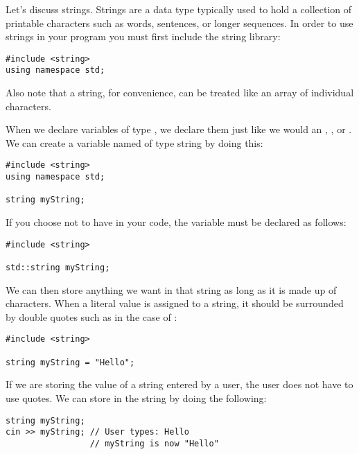 
Let's discuss strings.
Strings are a data type typically used to hold a collection of printable characters such as words, sentences, or longer sequences.
In order to use strings in your program you must first include the string library:
\begin{lstlisting}
#include <string>
using namespace std;
\end{lstlisting}

\noindent Also note that a string, for convenience, can be treated like an array of individual characters.

When we declare variables of type , we declare them just like we would an , , or .
We can create a variable named  of type string by doing this:

\begin{lstlisting}
#include <string>
using namespace std;

string myString;
\end{lstlisting}

\noindent If you choose not to have  in your code, the variable  must be declared as follows:

\noindent\begin{minipage}{\textwidth}\begin{lstlisting}
#include <string>

std::string myString;
\end{lstlisting}\end{minipage}

\noindent We can then store anything we want in that string as long as it is made up of characters.
When a literal value is assigned to a string, it should be surrounded by double quotes such as in the case of :

\noindent\begin{minipage}{\textwidth}\begin{lstlisting}
#include <string>

string myString = "Hello";
\end{lstlisting}\end{minipage}

If we are storing the value of a string entered by a user, the user does not have to use quotes.
We can store  in the string by doing the following:

\noindent\begin{minipage}{\textwidth}\begin{lstlisting}
string myString;
cin >> myString; // User types: Hello
                 // myString is now "Hello"
\end{lstlisting}\end{minipage}

